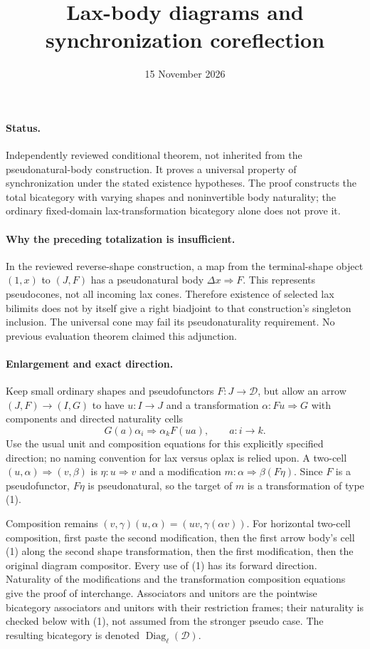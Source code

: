 \documentclass{article}
\title{Lax-body diagrams and synchronization coreflection}
\date{15 November 2026}
\begin{document}
\maketitle
\paragraph{Status.} Independently reviewed conditional theorem, not inherited from the pseudonatural-body construction. It proves a universal property of synchronization under the stated existence hypotheses. The proof constructs the total bicategory with varying shapes and noninvertible body naturality; the ordinary fixed-domain lax-transformation bicategory alone does not prove it.

\paragraph{Why the preceding totalization is insufficient.} In the reviewed reverse-shape construction, a map from the terminal-shape object $(1,x)$ to $(J,F)$ has a pseudonatural body $\Delta x\Rightarrow F$. This represents pseudocones, not all incoming lax cones. Therefore existence of selected lax bilimits does not by itself give a right biadjoint to that construction's singleton inclusion. The universal cone may fail its pseudonaturality requirement. No previous evaluation theorem claimed this adjunction.

\paragraph{Enlargement and exact direction.} Keep small ordinary shapes and pseudofunctors $F:J\to\mathcal D$, but allow an arrow $(J,F)\to(I,G)$ to have $u:I\to J$ and a transformation $\alpha:Fu\Rightarrow G$ with components and directed naturality cells
\[
 G(a)\alpha_i\Longrightarrow\alpha_kF(u a),\qquad a:i\to k.
\tag{1}
\]
Use the usual unit and composition equations for this explicitly specified direction; no naming convention for lax versus oplax is relied upon. A two-cell $(u,\alpha)\Rightarrow(v,\beta)$ is $\eta:u\Rightarrow v$ and a modification $m:\alpha\Rightarrow\beta(F\eta)$. Since $F$ is a pseudofunctor, $F\eta$ is pseudonatural, so the target of $m$ is a transformation of type (1).

Composition remains $(v,\gamma)(u,\alpha)=(uv,\gamma(\alpha v))$. For horizontal two-cell composition, first paste the second modification, then the first arrow body's cell (1) along the second shape transformation, then the first modification, then the original diagram compositor. Every use of (1) has its forward direction. Naturality of the modifications and the transformation composition equations give the proof of interchange. Associators and unitors are the pointwise bicategory associators and unitors with their restriction frames; their naturality is checked below with (1), not assumed from the stronger pseudo case. The resulting bicategory is denoted $\operatorname{Diag}_{\ell}(\mathcal D)$.
\end{document}
